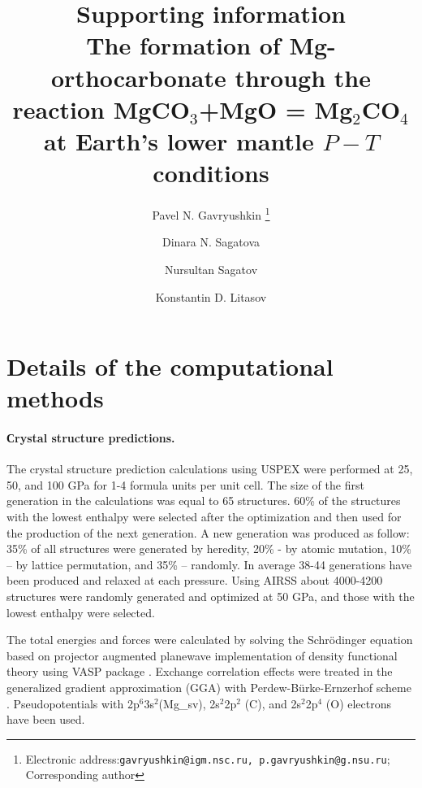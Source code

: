 \documentclass[a4paperm]{article}
\begin{document}

\title{{\bf Supporting information} \\ \bigskip
The formation of Mg-orthocarbonate through the reaction MgCO$_3$+MgO = Mg$_2$CO$_4$ at Earth's lower mantle $P-T$ conditions}


\author[1,2]{Pavel N. Gavryushkin
   \thanks{Electronic address:\texttt{gavryushkin@igm.nsc.ru, p.gavryushkin@g.nsu.ru}; Corresponding author}}     
\author[1,2]{Dinara N. Sagatova}
\author[1]{Nursultan Sagatov}
\author[3]{Konstantin D. Litasov}


\date{}
\maketitle


\section*{Details of the computational methods}
\paragraph{Сrystal structure predictions.}
The crystal structure prediction calculations using USPEX were performed at 25, 50, and 100 GPa for 1-4 formula units per unit cell.
The size of the first generation in the calculations was equal to 65 structures.
60\% of the structures with the lowest enthalpy were selected after the optimization and then used for the production of the next generation.
A new generation was produced as follow: 35\% of all structures were generated by heredity, 20\% - by atomic mutation, 10\% – by lattice permutation, and 35\% – randomly.
In average 38-44 generations have been produced and relaxed at each pressure.
Using AIRSS about 4000-4200 structures were randomly generated and optimized at 50 GPa, and those with the lowest enthalpy were selected.

The total energies and forces were calculated by solving the Schr\"{o}dinger equation based on projector augmented planewave implementation of density functional theory using VASP package \cite{vasp1,vasp2}.
Exchange correlation effects were treated in the generalized gradient approximation (GGA) with Perdew-B\"{u}rke-Ernzerhof scheme \cite{pbe}.
Pseudopotentials with 2p$^6$3s$^2$(Mg\_sv), 2s$^2$2p$^2$ (C), and 2s$^2$2p$^4$ (O) electrons have been used.
\end{document}
